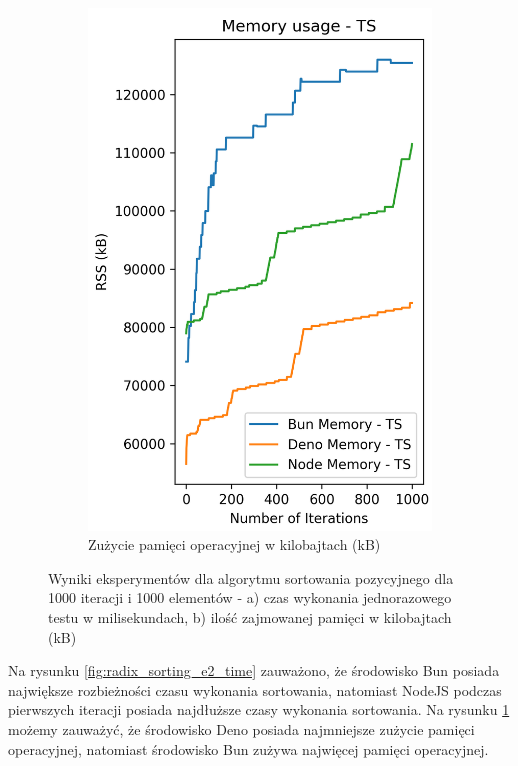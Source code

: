 \begin{figure}[H]
\begin{subfigure}[b]{0.42\textwidth}
  \end{subfigure}
  \begin{subfigure}[b]{0.42\textwidth}
    \centering
    \includegraphics[width=\textwidth]{Figures/sorting/sorting_radix_1000_1000_ts_memory.png}
    \caption{Zużycie pamięci operacyjnej w kilobajtach (kB)}
    \label{fig:radix_sorting_e2_ts_memory}
  \end{subfigure}
  \caption{Wyniki eksperymentów dla algorytmu sortowania pozycyjnego dla 1000 iteracji i 1000 elementów - a) czas wykonania jednorazowego testu w milisekundach, b) ilość zajmowanej pamięci w kilobajtach (kB)}
  \label{fig:radix_sorting_e2_ts}
\end{figure}

Na rysunku \ref{fig:radix_sorting_e2_time} zauważono, że środowisko Bun posiada największe rozbieżności czasu wykonania sortowania, natomiast NodeJS podczas pierwszych iteracji posiada najdłuższe czasy wykonania sortowania. Na rysunku \ref{fig:radix_sorting_e2_ts_memory} możemy zauważyć, że środowisko Deno posiada najmniejsze zużycie pamięci operacyjnej, natomiast środowisko Bun zużywa najwięcej pamięci operacyjnej. 

